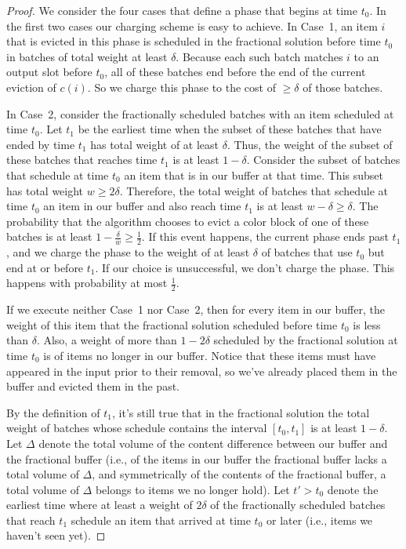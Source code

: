 \documentclass[12pt]{article}
\begin{document}
\begin{proof}
We consider the four cases that define a phase that
begins at time $t_0$. In the first two cases our 
charging scheme is easy to achieve. In Case~1, 
an item $i$ that is evicted in this phase is scheduled 
in the fractional solution before time $t_0$ in batches 
of total weight at least $\delta$. Because each such 
batch matches $i$ to an output slot before $t_0$, all 
of these batches end before the end of the current 
eviction of $c(i)$. So we charge this phase to the cost
of $\ge\delta$ of those batches.

In Case~2, consider the fractionally scheduled
batches with an item scheduled at time $t_0$. Let $t_1$ 
be the earliest time when the subset of these batches 
that have ended by time $t_1$ has total weight of at 
least $\delta$. Thus, the weight of the subset of these 
batches that reaches time $t_1$ is at least $1 - \delta$. 
Consider the subset of batches that schedule at 
time $t_0$ an item that is in our buffer at that time. 
This subset has total weight $w\ge 2\delta$. Therefore, 
the total weight of batches that schedule at time $t_0$ 
an item in our buffer and also reach time $t_1$ is at least 
$w - \delta\ge \delta$. The probability that the algorithm 
chooses to evict a color block of one of these batches
is at least $1 - \frac{\delta}{w}\ge\frac 1 2$.
If this event happens, the current phase ends past $t_1$, and
we charge the phase to the weight of at least $\delta$ 
of batches that use $t_0$ but end at or before $t_1$.
If our choice is unsuccessful, we don't charge the phase. 
This happens with probability at most $\frac 1 2$.

If we execute neither Case~1 nor Case~2, then for
every item in our buffer, the weight of this item that the 
fractional solution scheduled before time $t_0$ 
is less than $\delta$. Also, a weight of more than 
$1 - 2\delta$ scheduled by the fractional solution at time 
$t_0$ is of items no longer in our buffer. Notice that these items
must have appeared in the input prior to their removal, so 
we've already placed them in the buffer and evicted them in 
the past.

By the definition of $t_1$, it's still true that in the fractional 
solution the total weight of batches whose schedule contains
the interval $[t_0,t_1]$ is at least $1 - \delta$.
Let $\Delta$ denote the total volume of the content difference 
between our buffer and the fractional buffer (i.e., of the items 
in our buffer the fractional buffer lacks a total volume of $\Delta$,
and symmetrically of the contents of the fractional buffer, a
total volume of $\Delta$ belongs to items we no longer hold). 
Let $t' > t_0$ denote the earliest time where at least a weight 
of $2\delta$ of the fractionally scheduled batches that reach 
$t_1$ schedule an item that arrived at time $t_0$ or later (i.e., 
items we haven't seen yet).


\end{proof}
\end{document}
